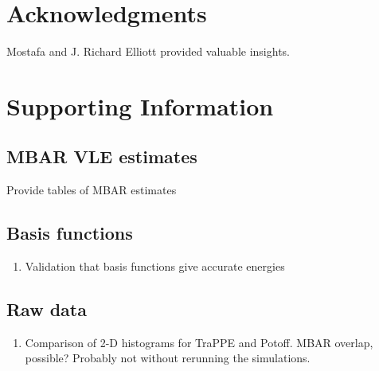 \documentclass[journal=jced,manuscript=article]{achemso}
\begin{document}
\section{Acknowledgments}

Mostafa and J. Richard Elliott provided valuable insights.



\section{Supporting Information}

\subsection{MBAR VLE estimates}

Provide tables of MBAR estimates

\subsection{Basis functions}

\begin{enumerate}
	\item Validation that basis functions give accurate energies
\end{enumerate}

\subsection{Raw data}

\begin{enumerate}
	\item Comparison of 2-D histograms for TraPPE and Potoff. MBAR overlap, possible? Probably not without rerunning the simulations.
\end{enumerate}
\end{document}
